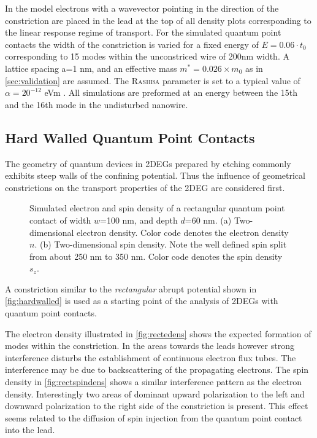 In the model electrons with a wavevector pointing in the direction of the constriction are placed in the lead at the top of all density plots corresponding to the linear response regime of transport.
For the simulated quantum point contacts the width of the constriction is varied for a fixed energy of $E=0.06\cdot t_0$ corresponding to 15 modes within the unconstriced wire of 200nm width. A lattice spacing a=1 nm, and an effective mass  $m^*=0.026 \times m_0$ as in \cref{sec:validation} are assumed. The \textsc{Rashba} parameter is set to a typical value of $\alpha = 20^{-12}$ eVm \cite{Jacob2009Thesis}. All simulations are preformed at an energy between the 15th and the 16th mode in the undisturbed nanowire.
\subsection{Hard Walled Quantum Point Contacts}
The geometry of quantum devices in 2DEGs prepared by etching commonly exhibits steep walls of the confining potential. Thus the influence of geometrical constrictions on the transport properties of the 2DEG are considered first.
\begin{figure}[h]
\caption{Simulated electron and spin density of a rectangular quantum point contact of  width $w$=100 nm, and depth $d$=60 nm. (a) Two-dimensional electron density. Color code denotes the electron density $n$. (b) Two-dimensional spin density. Note the well defined spin split from about 250 nm to 350 nm. Color code denotes the spin density $s_z$.}
\end{figure}
A constriction similar to the \emph{rectangular} abrupt potential shown in \cref{fig:hardwalled} is used as a starting point of the analysis of 2DEGs with quantum point contacts.\par
The electron density illustrated in \cref{fig:rectedens} shows the expected formation of modes within the constriction. In the areas towards the leads however strong interference disturbs the establishment of continuous electron flux tubes. The interference may be due to backscattering of the propagating electrons. The spin density in \cref{fig:rectspindens} shows a similar interference pattern as the electron density. Interestingly two areas of dominant upward polarization to the left and downward polarization to the right side of the constriction is present. This effect seems related to the diffusion of spin injection from the quantum point contact into the lead.\par
